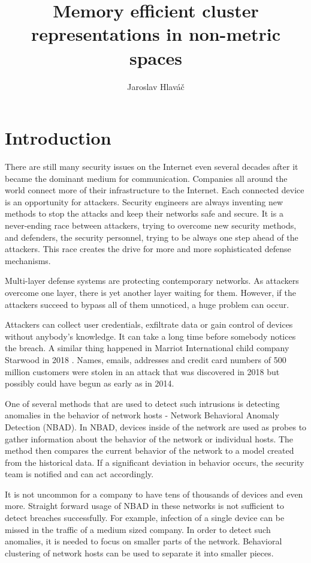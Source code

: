 \documentclass[thesis=B,english]{FITthesis}[2012/10/20]
\title{ Memory efficient cluster representations in non-metric spaces}
\author{Jaroslav Hlaváč} %
\begin{document}

\chapter{Introduction}

There are still many security issues on the Internet even several decades after it became the dominant medium for communication.
Companies all around the world connect more of their infrastructure to the Internet.
Each connected device is an opportunity for attackers.
Security engineers are always inventing new methods to stop the attacks and keep their networks safe and secure.
It is a never-ending race between attackers, trying to overcome new security methods, and defenders, the security personnel, trying to be always one step ahead of the attackers.
This race creates the drive for more and more sophisticated defense mechanisms.

Multi-layer defense systems are protecting contemporary networks.
As attackers overcome one layer, there is yet another layer waiting for them.
However, if the attackers succeed to bypass all of them unnoticed, a huge problem can occur.

Attackers can collect user credentials,  exfiltrate data or gain control of devices without anybody's knowledge.
It can take a long time before somebody notices the breach.
A similar thing happened in Marriot International child company Starwood in 2018 \cite{hron2018breaches}.
Names, emails, addresses and credit card numbers of 500 million customers were stolen in an attack that was discovered in 2018 but possibly could have begun as early as in 2014.

One of several methods that are used to detect such intrusions is detecting anomalies in the behavior of network hosts - Network Behavioral Anomaly Detection (NBAD).
In NBAD, devices inside of the network are used as probes to gather information about the behavior of the network or individual hosts.
The method then compares the current behavior of the network to a model created from the historical data.
If a significant deviation in behavior occurs, the security team is notified and can act accordingly.

It is not uncommon for a company to have tens of thousands of devices and even more.
Straight forward usage of NBAD in these networks is not sufficient to detect breaches successfully.
For example, infection of a single device can be missed in the traffic of a medium sized company.
In order to detect such anomalies, it is needed to focus on smaller parts of the network.
Behavioral clustering of network hosts can be used to separate it into smaller pieces.
\end{document}
